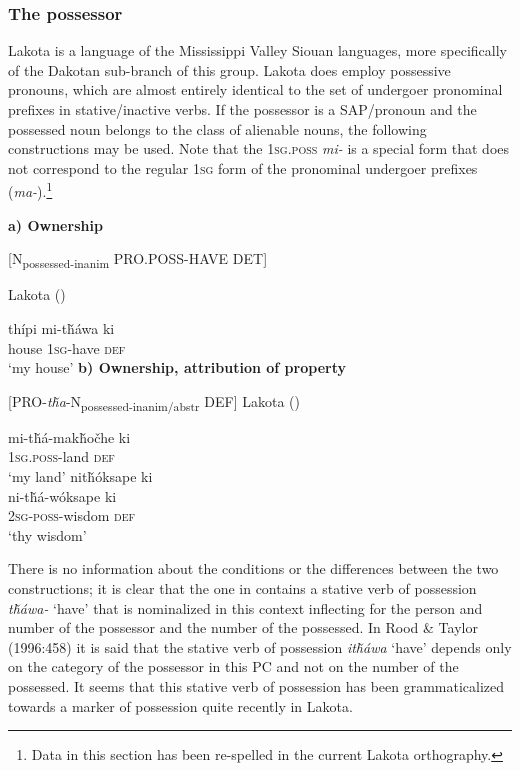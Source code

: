 \documentclass[output=paper]{LSP/langsci}
\begin{document}
\subsubsection{The possessor}
Lakota is a language of the Mississippi Valley Siouan languages, more specifically of the Dakotan sub-branch of this group. Lakota does employ possessive pronouns, which are almost entirely identical to the set of undergoer pronominal prefixes in stative/inactive verbs. If the possessor is a SAP/pronoun and the possessed noun belongs to the class of alienable nouns, the following constructions may be used. Note that the \textsc{1sg.poss} \textit{mi-} is a special form that does not correspond to the regular \textsc{1sg} form of the pronominal undergoer prefixes (\textit{ma-}).\footnote{Data in this section has been re-spelled in the current Lakota orthography.}

\vspace{1em}
\textbf{a)	Ownership}

[N\textsubscript{possessed-inanim} PRO.POSS-HAVE DET]
\vspace{1em}

\ea Lakota (\citealt[98]{Buechel1939}) \label{lakotahouse}

\gll thípi     mi-t\v{h}áwa ki \\
house \textsc{1sg}-have  \textsc{def} \\
\glt `my house'
\z
\vspace{1em}
\textbf{b) Ownership, attribution of property}

[PRO-\textit{t\v{h}a}-N\textsubscript{possessed-inanim/abstr} DEF]
\vspace{1em}
\ea Lakota (\citealt[98]{Buechel1939}) \label{lakotalandwisdom}

\ea \gll mi-t\v{h}á-mak\v{h}o\v{c}he   ki \\
\textsc{1sg.poss}-land   \textsc{def} \\
\glt `my land'
\ex  
\glll nit\v{h}óksape ki \\
 ni-t\v{h}á-wóksape   ki \\
\textsc{2sg-poss}-wisdom  \textsc{def} \\
\glt `thy wisdom'
\z \z

There is no information about the conditions or the differences between the two constructions; it is clear that the one in  contains a stative verb of possession \textit{t\v{h}áwa-} `have' that is nominalized in this context inflecting for the person and number of the possessor and the number of the possessed. In Rood \& Taylor (1996:458) it is said that the stative verb of possession \textit{it\v{h}áwa} `have' depends only on the category of the possessor in this PC and not on the number of the possessed. It seems that this stative verb of possession has been grammaticalized towards a marker of possession quite recently in Lakota. 
\end{document}
